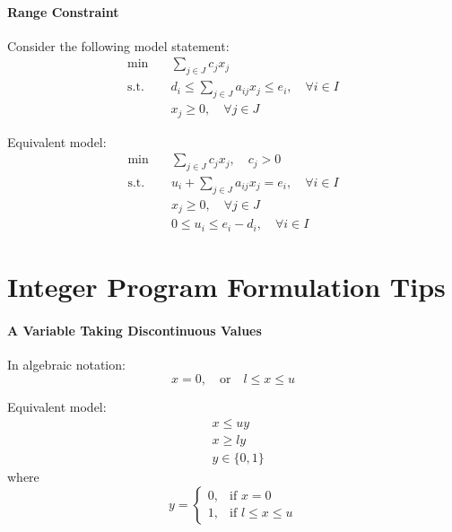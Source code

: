         \paragraph{Range Constraint}
            
            Consider the following model statement:
            \begin{align*}
                \min \quad & \sum_{j\in J}c_jx_j \\
                \text{s.t.} \quad & d_i\le \sum_{j\in J}a_{ij}x_j \le e_i, \quad \forall i\in I \\
                                  & x_j \ge 0, \quad \forall j\in J 
            \end{align*}
            
            Equivalent model:
            \begin{align*}
                \min \quad & \sum_{j\in J}c_jx_j, \quad c_j > 0 \\
                \text{s.t.} \quad & u_i + \sum_{j\in J}a_{ij}x_j = e_i, \quad \forall i\in I \\
                                  & x_j \ge 0, \quad \forall j\in J \\
                                  & 0\le u_i \le e_i-d_i, \quad \forall i\in I 
            \end{align*}

    \section{Integer Program Formulation Tips}
        \paragraph{A Variable Taking Discontinuous Values}
             In algebraic notation: 
            \begin{equation*}
                x = 0,\quad \text{or} \quad l\le x \le u 
            \end{equation*}
            
            Equivalent model:
            \begin{align*}
                & x \le uy \\
                & x \ge ly  \\
                & y \in \{0, 1\} 
            \end{align*}
            where
            \begin{equation*}y=\begin{cases}0, & \text{if }x=0 \\ 1, & \text{if } l\le x \le u\end{cases} \end{equation*}
                
